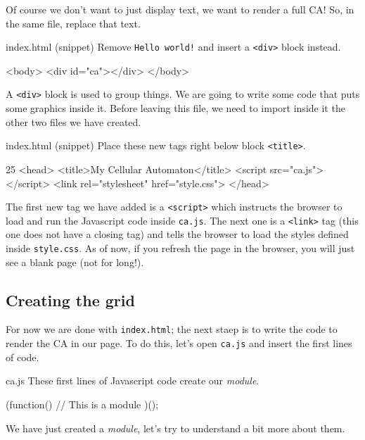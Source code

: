 Of course we don't want to just display text, we want to render a full CA! So, in the same file, replace
that text.

\begin{programcode}{index.html (snippet)}
Remove \texttt{Hello world!} and insert a \texttt{<div>} block instead.
\begin{codehtml}
<body>
  <div id="ca"></div>
</body>
\end{codehtml}
\end{programcode}

A \texttt{<div>} block is used to group things. We are going to write some code that puts some graphics
inside it. Before leaving this file, we need to import inside it the other two files we have created.

\begin{programcode}{index.html (snippet)}
Place these new tags right below block \texttt{<title>}.
\begin{codehtmlh1}{2}{5}
<head>
  <title>My Cellular Automaton</title>
  <script src="ca.js"></script>
  <link rel="stylesheet" href="style.css">
</head>
\end{codehtmlh1}
\end{programcode}

The first new tag we have added is a \texttt{<script>} which instructs the browser to load and run the
Javascript code inside \texttt{ca.js}. The next one is a \texttt{<link>} tag (this one does not have a closing tag)
and tells the browser to load the styles defined inside \texttt{style.css}. As of now, if you refresh the
page in the browser, you will just see a blank page (not for long!).

\subsection{Creating the grid}
For now we are done with \texttt{index.html}; the next staep is to write the code to render the CA
in our page. To do this, let's open \texttt{ca.js} and insert the first lines of code.

\begin{programcode}{ca.js}
These first lines of Javascript code create our \textit{module}.
\begin{code}
(function(){
  // This is a module
})();
\end{code}
\end{programcode}

We have just created a \textit{module}, let's try to understand a bit more about them.

